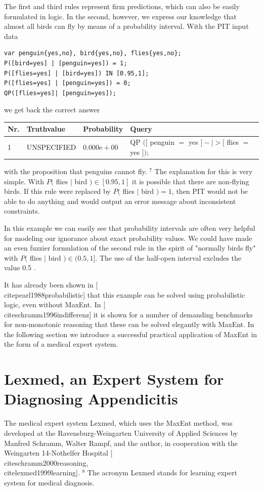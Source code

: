 \documentclass[10pt]{book}
\begin{document}
The first and third rules represent firm predictions, which can also be easily formulated in logic. In the second, however, we express our knowledge that almost all birds can fly by means of a probability interval. With the PIT input data

\begin{verbatim}
var penguin{yes,no}, bird{yes,no}, flies{yes,no};
P([bird=yes] | [penguin=yes]) = 1;
P([flies=yes] | [bird=yes]) IN [0.95,1];
P([flies=yes] | [penguin=yes]) = 0;
QP([flies=yes]| [penguin=yes]);
\end{verbatim}

we get back the correct answer

\begin{center}
\begin{tabular}{llll}
\hline
Nr. & Truthvalue & Probability & Query \\
\hline
1 & UNSPECIFIED & $0.000 \mathrm{e}+00$ & QP $([$ penguin $=$ yes $]-\mid>[$ flies $=$ yes $]) ;$ \\
\hline
\end{tabular}
\end{center}

with the proposition that penguins cannot fly. ${ }^{7}$ The explanation for this is very simple. With $P($ flies $\mid$ bird $) \in[0.95,1]$ it is possible that there are non-flying birds. If this rule were replaced by $P($ flies $\mid$ bird $)=1$, then PIT would not be able to do anything and would output an error message about inconsistent constraints.

In this example we can easily see that probability intervals are often very helpful for modeling our ignorance about exact probability values. We could have made an even fuzzier formulation of the second rule in the spirit of "normally birds fly" with $P($ flies $\mid$ bird $) \in(0.5,1]$. The use of the half-open interval excludes the value 0.5 .

It has already been shown in [\\cite{pearl1988probabilistic}] that this example can be solved using probabilistic logic, even without MaxEnt. In [\\cite{schramm1996indifferenz}] it is shown for a number of demanding benchmarks for non-monotonic reasoning that these can be solved elegantly with MaxEnt. In the following section we introduce a successful practical application of MaxEnt in the form of a medical expert system.

\section{Lexmed, an Expert System for Diagnosing Appendicitis}
The medical expert system Lexmed, which uses the MaxEnt method, was developed at the Ravensburg-Weingarten University of Applied Sciences by Manfred Schramm, Walter Rampf, and the author, in cooperation with the Weingarten 14-Nothelfer Hospital [\\cite{schramm2000reasoning}, \\cite{lexmed1999learning}]. ${ }^{8}$ The acronym Lexmed stands for learning expert system for medical diagnosis.
\end{document}
